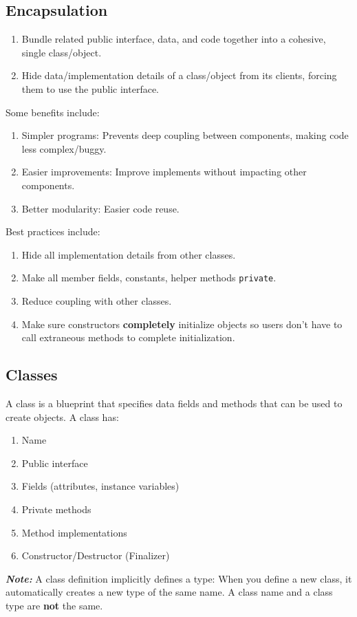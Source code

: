 \documentclass{article}
\begin{document}
\subsection{Encapsulation}
\begin{enumerate}[label=(\roman*)]
\item Bundle related public interface, data, and code together into a
  cohesive, single class/object.
\item Hide data/implementation details of a class/object from its clients,
  forcing them to use the public interface.
\end{enumerate}
Some benefits include:
\begin{enumerate}[label=(\roman*)]
\item Simpler programs: Prevents deep coupling between components,
  making code less complex/buggy.
\item Easier improvements: Improve implements without impacting other
  components. 
\item Better modularity: Easier code reuse.
\end{enumerate}
Best practices include:
\begin{enumerate}[label=(\roman*)]
\item Hide all implementation details from other classes.
\item Make all member fields, constants, helper methods \texttt{private}.
\item Reduce coupling with other classes.
\item Make sure constructors \textbf{completely} initialize objects so
  users don't have to call extraneous methods to complete initialization.
\end{enumerate}

\subsection{Classes}
A class is a blueprint that specifies data fields and methods that can
be used to create objects. A class has:
\begin{enumerate}[label=(\roman*)]
\item Name
\item Public interface
\item Fields (attributes, instance variables)
\item Private methods
\item Method implementations
\item Constructor/Destructor (Finalizer)
\end{enumerate}
\textit{\textbf{Note:}} A class definition implicitly defines a type: When you
define a new class, it automatically creates a new type of the same
name. A class name and a class type are \textbf{not} the same.
\end{document}
